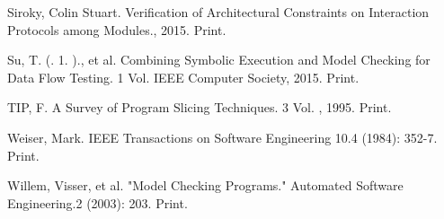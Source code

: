\documentclass[peerreview]{IEEEtran}
\begin{document}
\begin{thebibliography}{1}
 Siroky, Colin Stuart. Verification of Architectural Constraints on Interaction Protocols among Modules., 2015. Print. 

Su, T. (. 1. )., et al. Combining Symbolic Execution and Model Checking for Data Flow Testing. 1 Vol. IEEE Computer Society, 2015. Print. 

 TIP, F. A Survey of Program Slicing Techniques. 3 Vol. , 1995. Print. 

 Weiser, Mark. IEEE Transactions on Software Engineering 10.4 (1984): 352-7. Print. 

 Willem, Visser, et al. "Model Checking Programs." Automated Software Engineering.2 (2003): 203. Print.
\end{thebibliography}

\end{document}
